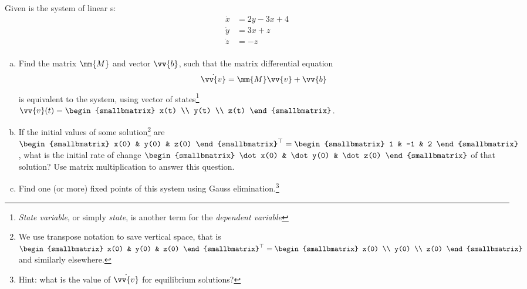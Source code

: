 \begin{question}
  Given is the system of linear \ode{}s:
  \begin{align*}
          \dot x &= 2y - 3x + 4 \\
          \dot y &= 3x + z \\
          \dot z &= -z \\
  \end{align*}

\begin{enumerate}[(a)]
\item Find the matrix \(\mm{M}\) and vector \(\vv{b}\), such that the matrix differential equation
  \begin{equation}
  \dot{\vv{v}} = \mm{M} \vv{v} + \vv{b}\label{eq:wk-11-1}
\end{equation}
   is equivalent to the system, using vector of states\footnote{\emph{State variable}, or simply \emph{state}, is another term for the \emph{dependent variable}} \(\vv{v}(t) =
  \begin{smallbmatrix}
    x(t) \\ y(t) \\ z(t)
  \end{smallbmatrix}
  \).
  \solspace{0.75in}
  \item If the initial values of some solution\footnote{We use transpose notation to save vertical space, that is \(\begin{smallbmatrix}
      x(0) & y(0) & z(0)
    \end{smallbmatrix}^{\top} = \begin{smallbmatrix}
      x(0) \\ y(0) \\ z(0)
    \end{smallbmatrix}\) and similarly elsewhere.} are \(
    \begin{smallbmatrix}
      x(0) & y(0) & z(0)
    \end{smallbmatrix}^{\top} =
    \begin{smallbmatrix}
      1 & -1 & 2
    \end{smallbmatrix}
    \), what is the initial rate of change \(    \begin{smallbmatrix}
     \dot x(0) & \dot y(0) & \dot z(0)
    \end{smallbmatrix}
    \)
    of that solution? Use matrix multiplication to answer this question.
  \solspace{0.75in}

\item Find one (or more) fixed points  of this system using Gauss elimination.\footnote{Hint: what is the value of \(\dot{\vv{v}}\) for equilibrium solutions?}
  \solspace{2.25in}


\end{enumerate}
\end{question}

